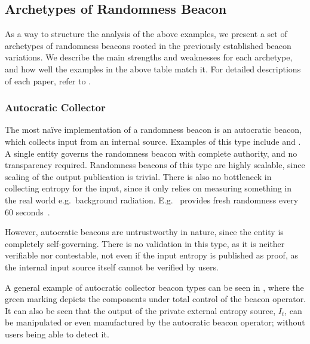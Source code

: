 \subsection{Archetypes of Randomness Beacon}
As a way to structure the analysis of the above examples, we present a set of archetypes of randomness beacons rooted in the previously established beacon variations.
We describe the main strengths and weaknesses for each archetype, and how well the examples in the above table match it.
For detailed descriptions of each paper, refer to .

\subsubsection{Autocratic Collector}\label{ssub:autocratic}
The most naïve implementation of a randomness beacon is an autocratic beacon, which collects input from an internal source.
Examples of this type include  and .
A single entity governs the randomness beacon with complete authority, and no transparency required.
Randomness beacons of this type are highly scalable, since scaling of the output publication is trivial.
There is also no bottleneck in collecting entropy for the input, since it only relies on measuring something in the real world e.g.\ background radiation.
E.g.\  provides fresh randomness every 60 seconds~\cite{nistbeacon}.

However, autocratic beacons are untrustworthy in nature, since the entity is completely self-governing.
There is no validation in this type, as it is neither verifiable nor contestable, not even if the input entropy is published as proof, as the internal input source itself cannot be verified by users.

A general example of autocratic collector beacon types can be seen in , where the green marking depicts the components under total control of the beacon operator.
It can also be seen that the output of the private external entropy source, $I_t$, can be manipulated or even manufactured by the autocratic beacon operator; without users being able to detect it.

